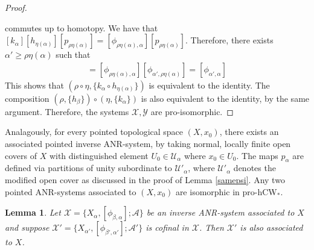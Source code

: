 \documentclass[a4paper,11pt]{article}
\theoremstyle{definition}
\theoremstyle{plain}
\newtheorem{lemma}[definition]{Lemma}
\theoremstyle{remark}
\begin{document}
{\begin{proof}
 \begin{figure}[H]
\center
{}
 \end{figure}
commutes up to homotopy. We have that $[k_{\alpha}][h_{\eta(\alpha)}][p_{\rho\eta(\alpha)}]=[\phi_{\rho\eta(\alpha),\alpha}][p_{\rho\eta(\alpha)}]$. Therefore, there exists $\alpha'\geq \rho\eta(\alpha)$ such that 
\begin{align*}
[k_{\alpha}][h_{\eta(\alpha)}] [\phi_{\alpha',\rho\eta(\alpha)}] = [\phi_{\rho\eta(\alpha),\alpha}][\phi_{\alpha',\rho\eta(\alpha)}] = [\phi_{\alpha',\alpha}]
\end{align*}
This shows that $(\rho\circ\eta, \{k_{\alpha}\circ h_{\eta(\alpha)}\})$ is equivalent to the identity. The composition $ (\rho,\{h_{\beta}\})\circ (\eta,\{k_{\alpha}\})$ is also equivalent to the identity, by the same argument. Therefore, the systems $\mathcal{X},\mathcal{Y}$ are pro-isomorphic. 
\end{proof}

Analagously, for every pointed topological space $(X,x_0)$, there exists an associated pointed inverse ANR-system, by taking normal, locally finite open covers of $X$ with distinguished element $U_{0}\in \mathcal{U}_{\alpha}$ where $x_0\in U_{0}$. The maps $p_{\alpha}$ are defined via partitions of unity subordinate to $\mathcal{U}'_{\alpha}$, where $\mathcal{U}'_{\alpha}$ denotes the modified open cover as discussed in the proof of Lemma \ref{samepsi}. Any two pointed ANR-systems associated to $(X,x_0)$ are isomorphic in pro-hCW$_{\ast}$. 

\begin{lemma} \label{cofinalsys} Let $\mathcal{X} = \{X_{\alpha}, [\phi_{\beta,\alpha}]; \mathcal{A}\}$ be an inverse ANR-system associated to $X$ and suppose $\mathcal{X}' = \{X_{\alpha'}, [\phi_{\beta',\alpha'}]; \mathcal{A}'\}$ is cofinal in $\mathcal{X}$. Then $\mathcal{X}'$ is also associated to $X$. 
\end{lemma}

}
\end{document}
